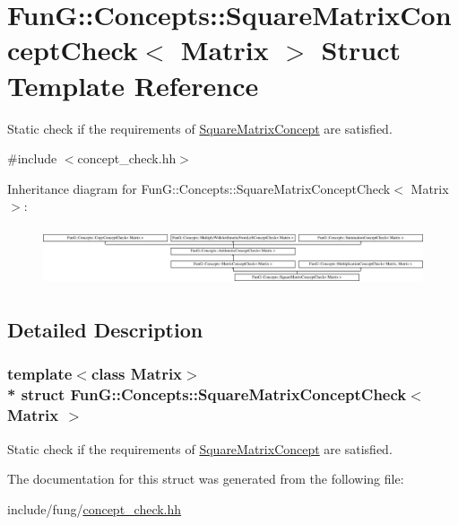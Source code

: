 \hypertarget{structFunG_1_1Concepts_1_1SquareMatrixConceptCheck}{}\section{FunG\+:\+:Concepts\+:\+:Square\+Matrix\+Concept\+Check$<$ Matrix $>$ Struct Template Reference}
\label{structFunG_1_1Concepts_1_1SquareMatrixConceptCheck}


Static check if the requirements of \hyperlink{structFunG_1_1Concepts_1_1SquareMatrixConcept}{Square\+Matrix\+Concept} are satisfied.  




{\ttfamily \#include $<$concept\+\_\+check.\+hh$>$}

Inheritance diagram for FunG\+:\+:Concepts\+:\+:Square\+Matrix\+Concept\+Check$<$ Matrix $>$\+:\begin{figure}[H]
\begin{center}
\leavevmode
\includegraphics[height=1.728395cm]{structFunG_1_1Concepts_1_1SquareMatrixConceptCheck}
\end{center}
\end{figure}


\subsection{Detailed Description}
\subsubsection*{template$<$class Matrix$>$\\*
struct Fun\+G\+::\+Concepts\+::\+Square\+Matrix\+Concept\+Check$<$ Matrix $>$}

Static check if the requirements of \hyperlink{structFunG_1_1Concepts_1_1SquareMatrixConcept}{Square\+Matrix\+Concept} are satisfied. 

The documentation for this struct was generated from the following file\+:\begin{DoxyCompactItemize}
\item 
include/fung/\hyperlink{concept__check_8hh}{concept\+\_\+check.\+hh}\end{DoxyCompactItemize}
